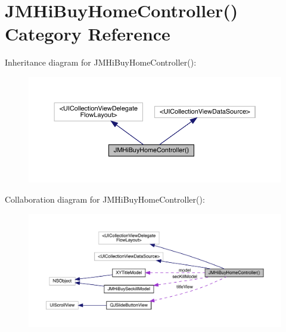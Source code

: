 \hypertarget{category_j_m_hi_buy_home_controller_07_08}{}\section{J\+M\+Hi\+Buy\+Home\+Controller() Category Reference}
\label{category_j_m_hi_buy_home_controller_07_08}


Inheritance diagram for J\+M\+Hi\+Buy\+Home\+Controller()\+:\nopagebreak
\begin{figure}[H]
\begin{center}
\leavevmode
\includegraphics[width=350pt]{category_j_m_hi_buy_home_controller_07_08__inherit__graph}
\end{center}
\end{figure}


Collaboration diagram for J\+M\+Hi\+Buy\+Home\+Controller()\+:\nopagebreak
\begin{figure}[H]
\begin{center}
\leavevmode
\includegraphics[width=350pt]{category_j_m_hi_buy_home_controller_07_08__coll__graph}
\end{center}
\end{figure}
